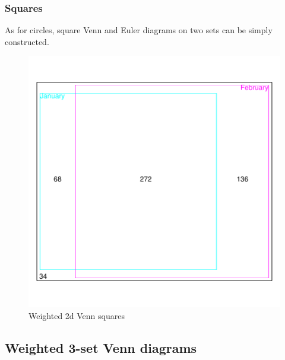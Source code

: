 \documentclass[a4paper]{article}
\begin{document}
\subsubsection{Squares}
As for circles, square Venn and Euler diagrams on two sets 
can be simply constructed.
\begin{figure}[H]
  \begin{center}
\includegraphics{Vennfig-sqpv2b}
\caption{Weighted 2d Venn squares}
\end{center}\end{figure}

\newpage
\subsection{Weighted 3-set Venn diagrams}
\end{document}
